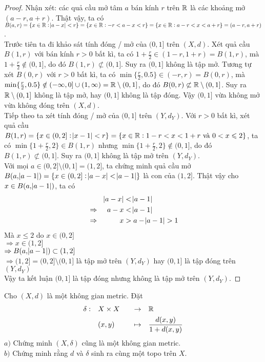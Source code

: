 \begin{proof}
Nhận xét: các quả cầu mở tâm $a$ bán kính $r$ trên $\mathbb R$ là các khoảng mở $(a-r,a+r)$. Thật vậy, ta có $B(a,r) = \{x\in\mathbb R : \abs{a-x} < r \} = \{x\in\mathbb R : -r < a-x < r \} = \{x\in\mathbb R : a-r < x < a+r\} = (a-r,a+r)$.\\[3mm]
Trước tiên ta đi khảo sát tính đóng / mở của $(0,1]$ trên $(X,d)$. Xét quả cầu $B(1,r)$ với bán kính $r > 0$ bất kì, ta có $1+\frac{r}{2} \in (1-r,1+r) = B(1,r)$, mà $1 + \frac{r}{2} \notin (0,1]$, do đó $B(1,r) \not\subset (0,1]$. Suy ra $(0,1]$ không là tập mở.\nll
Tương tự xét $B(0,r)$ với $r > 0$ bất kì, ta có $\min\{\frac{r}{2}, 0.5\} \in (-r,r) = B(0,r)$, mà $\min\{\frac{r}{2}, 0.5\} \notin (-\infty,0] \cup (1,\infty) = \mathbb R \setminus (0,1]$, do đó $B(0,r) \not\subset \mathbb R \setminus (0,1]$. Suy ra $\mathbb R \setminus (0,1]$ không là tập mở, hay $(0,1]$ không là tập đóng.\nll
Vậy $(0,1]$ vừa không mở vừa không đóng trên $(X,d)$.\QEDFill\\[3mm]
Tiếp theo ta xét tính đóng / mở của $(0,1]$ trên $(Y,d_Y)$. Với $r > 0$ bất kì, xét quả cầu $B(1,r) = \{x \in (0,2] : \abs{x-1} < r\} = \{x \in \mathbb R : 1-r < x < 1+r \text{ và } 0 < x \leqslant 2\}$, ta có $\min\{1 + \frac{r}{2}, 2\} \in B(1,r)$ nhưng $\min\{1 + \frac{r}{2}, 2\} \notin (0, 1]$, do đó $B(1,r) \not\subset (0,1]$. Suy ra $(0,1]$ không là tập mở trên $(Y,d_Y)$.\\[3mm]
Với mọi $a \in (0,2] \setminus (0,1] = (1,2]$, ta chứng minh quả cầu mở $B(a,\abs{a-1}) =  \{x \in (0,2] : \abs{a-x} < \abs{a-1}\}$ là con của $(1,2]$. Thật vậy cho $x \in B(a,\abs{a-1})$, ta có
\begin{alignat*}{3}
    & & \abs{a-x} &< \abs{a-1}\\
    &\Rightarrow& a-x &< \abs{a-1}\\
    &\Rightarrow& x &> a - \abs{a-1} > 1
\end{alignat*}
Mà $x \leq 2$ do $x \in (0,2]$\\
$\Rightarrow x \in (1,2]$\\
$\Rightarrow B(a,\abs{a-1}) \subset (1,2]$\\
$\Rightarrow (1,2] = (0,2] \setminus (0,1]$ là tập mở trên $(Y,d_Y)$ hay $(0,1]$ là tập đóng trên $(Y,d_Y)$\\
Vậy ta kết luận $(0,1]$ là tập đóng nhưng không là tập mở trên $(Y,d_Y)$.
\end{proof}

\begin{exercise}{16}
    Cho $(X,d)$ là một không gian metric. Đặt
    \begin{alignat*}{3}
        \delta:\quad &X \times X\quad &\rightarrow &\quad \R\\
        & (x,y)\quad &\mapsto &\quad \frac{d(x,y)}{1+d(x,y)}
    \end{alignat*}
    $a)$ Chứng minh $(X,\delta)$ cũng là một không gian metric.\\
    $b)$ Chứng minh rằng $d$ và $\delta$ sinh ra cùng một topo trên $X$.
\end{exercise}

